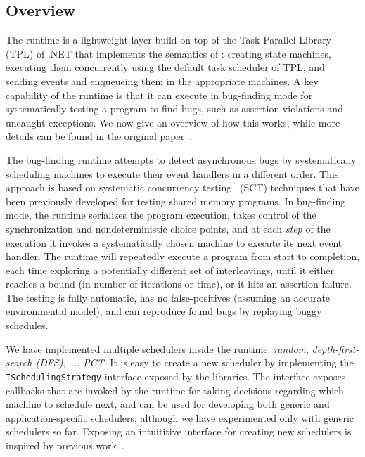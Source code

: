 \subsection{Overview}
\label{sec:psharp:overview}

The \psharp runtime is a lightweight layer build on top of the Task Parallel Library (TPL) of .NET that implements the semantics of \psharp: creating state machines, executing them concurrently using the default task scheduler of TPL, and sending events and enqueueing them in the appropriate machines. A key capability of the \psharp runtime is that it can execute in bug-finding mode for systematically testing a \psharp program to find bugs, such as assertion violations and uncaught exceptions. We now give an overview of how this works, while more details can be found in the original paper~\cite{deligiannis2015psharp}.

The \psharp bug-finding runtime attempts to detect asynchronous bugs by systematically scheduling machines to execute their event handlers in a different order. This approach is based on systematic concurrency testing~\cite{godefroid1997verisoft, musuvathi2008finding, emmi2011delay} (SCT) techniques that have been previously developed for testing shared memory programs. In bug-finding mode, the \psharp runtime serializes the program execution, takes control of the synchronization and nondeterministic choice points, and at each \emph{step} of the execution it invokes a systematically chosen \psharp machine to execute its next event handler. The \psharp runtime will repeatedly execute a program from start to completion, each time exploring a potentially different set of interleavings, until it either reaches a bound (in number of iterations or time), or it hits an assertion failure. The testing is fully automatic, has no false-positives (assuming an accurate environmental model), and can reproduce found bugs by replaying buggy schedules.

We have implemented multiple schedulers inside the \psharp runtime: \emph{random}, \emph{depth-first-search (DFS)}, ..., \emph{PCT}. It is easy to create a new scheduler by implementing the \texttt{ISchedulingStrategy} interface exposed by the \psharp libraries. The interface exposes callbacks that are invoked by the \psharp runtime for taking decisions regarding which machine to schedule next, and can be used for developing both generic and application-specific schedulers, although we have experimented only with generic schedulers so far. Exposing an intuititive interface for creating new schedulers is inspired by previous work~\cite{desai2015tr}.

